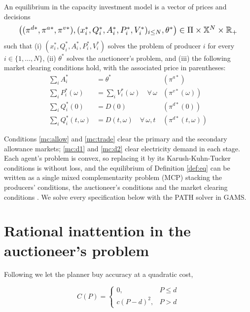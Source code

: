\documentclass[a4paper,fleqn]{cas-dc}
\begin{document}
\begin{definition}\label{def:eq}
An equilibrium in the capacity investment model is a vector of prices and decisions
\[
\resizebox{0.92\columnwidth}{!}{$
\left((\pi^{d*},\pi^{a*},\pi^{v*}),(x_i^*,Q_i^*,A_i^*,P_i^*,V_i^*)_{i\leq N},\theta^*\right)\in\Pi\times\mathbb{X}^N\times\mathbb{R}_+
$}
\]
such that (i) $(x_i^*,Q_i^*,A_i^*,P_i^*,V_i^*)$ solves the problem of producer $i$ for every $i\in\{1,\dots,N\}$, (ii) $\theta^*$ solves the auctioneer's problem, and (iii) the following market clearing conditions hold, with the associated price in parentheses:
\begin{align}
\sum_{i} A_i^* &= \theta^* & (\pi^{a*}) \label{mc:allow}\\
\sum_{i} P_i^*(\omega) &= \sum_{i} V_i^*(\omega) \quad \forall\,\omega & (\pi^{v*}(\omega)) \label{mc:trade}\\
\sum_{i} Q_i^*(0) &= D(0) & (\pi^{d*}(0)) \label{mc:d1}\\
\sum_{i} Q_i^*(t,\omega) &= D(t,\omega) \quad \forall\,\omega,t & (\pi^{d*}(t,\omega)) \label{mc:d2}
\end{align}
\end{definition}

Conditions \eqref{mc:allow} and \eqref{mc:trade} clear the primary and the secondary allowance markets; \eqref{mc:d1} and \eqref{mc:d2} clear electricity demand in each stage. Each agent's problem is convex, so replacing it by its Karush-Kuhn-Tucker conditions is without loss, and the equilibrium of Definition \ref{def:eq} can be written as a single mixed complementarity problem (MCP) stacking the producers' conditions, the auctioneer's conditions and the market clearing conditions \citep{ferris_complementarity_2000}. We solve every specification below with the PATH solver \citep{dirkse_path_1995} in GAMS.

\section{Rational inattention in the auctioneer's problem}\label{sec:inattention}

Following \citet{dewan_estimating_2020} we let the planner buy accuracy at a quadratic cost,

\begin{equation}\label{eq:costP}
C(P)=\begin{cases}0, & P\leq d\\ c(P-d)^2, & P>d\end{cases}
\end{equation}
\end{document}

